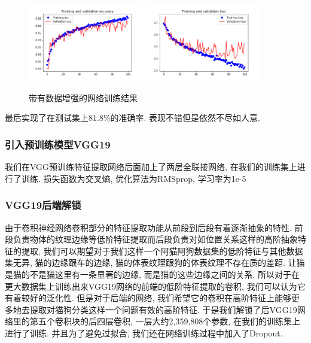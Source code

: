 \documentclass[lang=cn,11pt]{elegantpaper}
\begin{document}
\begin{figure}[hbt]
\centering
  \includegraphics[width=0.45\textwidth]{small_aug_1.png}
  \includegraphics[width=0.45\textwidth]{small_aug_2.png}
  \caption{带有数据增强的网络训练结果}
\end{figure}

最后实现了在测试集上81.8\%的准确率. 表现不错但是依然不尽如人意.


\subsubsection{引入预训练模型VGG19}

我们在VGG预训练特征提取网络后面加上了两层全联接网络, 在我们的训练集上进行了训练. 损失函数为交叉熵, 优化算法为RMSprop, 学习率为1e-5

\subsubsection{VGG19后端解锁}

由于卷积神经网络卷积部分的特征提取功能从前段到后段有着逐渐抽象的特性. 前段负责物体的纹理边缘等低阶特征提取而后段负责对如位置关系这样的高阶抽象特征的提取, 我们可以期望对于我们这样一个阿猫阿狗数据集的低阶特征与其他数据集无异, 猫的边缘跟车的边缘, 猫的体表纹理跟狗的体表纹理不存在质的差距. 让猫是猫的不是猫这里有一条显著的边缘, 而是猫的这些边缘之间的关系. 所以对于在更大数据集上训练出来VGG19网络的前端的低阶特征提取的卷积, 我们可以认为它有着较好的泛化性. 但是对于后端的网络, 我们希望它的卷积在高阶特征上能够更多地去提取对猫狗分类这样一个问题有效的高阶特征. 于是我们解锁了后VGG19网络里的第五个卷积块的后四层卷积, 一层大约2,359,808个参数, 在我们的训练集上进行了训练. 并且为了避免过拟合, 我们还在网络训练过程中加入了Dropout.
\end{document}
